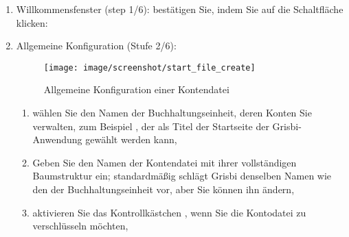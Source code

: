 \begin{enumerate}
	\item Willkommensfenster (step 1/6): bestätigen Sie, indem Sie auf die Schaltfläche  klicken:%
	\item Allgemeine Konfiguration (Stufe 2/6):
	
	\begin{figure}[htbp]
		\begin{center}
			\texttt{[image: image/screenshot/start\_file\_create]}
		\end{center}
		\caption{Allgemeine Konfiguration einer Kontendatei}%
		\label{start_file_create}
	\end{figure}

		\begin{enumerate}
			\item wählen Sie den Namen der Buchhaltungseinheit, deren Konten Sie verwalten, zum Beispiel , der als Titel der Startseite der Grisbi-Anwendung gewählt werden kann,%
			\item Geben Sie den Namen der Kontendatei mit ihrer vollständigen Baumstruktur ein; standardmäßig schlägt Grisbi denselben Namen wie den der Buchhaltungseinheit vor, aber Sie können ihn ändern,%
			\item aktivieren Sie das Kontrollkästchen , wenn Sie die Kontodatei \gls{zu verschlüsseln} möchten,%
		\end{enumerate}
		

\end{enumerate}

